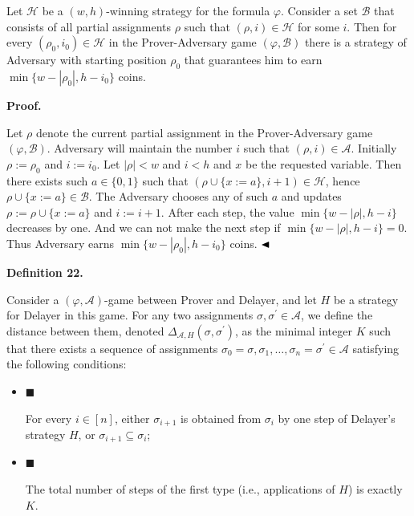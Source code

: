 \documentclass[10pt,a4paper]{article}
\begin{document}
Let $\mathcal{H}$ be a $(w,h)$-winning strategy for the formula $\varphi$.
Consider a set $\mathcal{B}$ that consists of all partial assignments $\rho$ such that $(\rho,i)\in\mathcal{H}$ for some $i$.
Then for every $(\rho_{0},i_{0})\in\mathcal{H}$ in the Prover-Adversary game $(\varphi,\mathcal{B})$ there is a strategy of Adversary with starting position $\rho_{0}$ that guarantees him to earn $\min\{w-|\rho_{0}|,h-i_{0}\}$ coins.\par



\par\medskip\noindent\textbf{Proof.}\par


Let $\rho$ denote the current partial assignment in the Prover-Adversary game
$(\varphi,\mathcal{B})$.
Adversary will maintain the number $i$ such that $(\rho,i)\in\mathcal{A}$.
Initially $\rho:=\rho_{0}$ and $i:=i_{0}$.
Let $|\rho|<w$ and $i<h$ and $x$ be the requested variable.
Then there exists such $a\in\{0,1\}$ such that $(\rho\cup\{x:=a\},i+1)\in\mathcal{H}$,
hence $\rho\cup\{x:=a\}\in\mathcal{B}$.
The Adversary chooses any of such $a$ and updates $\rho:=\rho\cup\{x:=a\}$ and $i:=i+1$.
After each step, the value $\min\{w-|\rho|,h-i\}$ decreases by one.
And we can not make the next step if $\min\{w-|\rho|,h-i\}=0$.
Thus Adversary earns $\min\{w-|\rho_{0}|,h-i_{0}\}$ coins.
$\hfill\blacktriangleleft$\par



\par\medskip\noindent\textbf{
Definition 22.
}\par



Consider a $(\varphi,\mathcal{A})$-game between Prover and Delayer, and let $H$ be a strategy for Delayer in this game.
For any two assignments $\sigma,\sigma^{\prime}\in\mathcal{A}$, we define the distance between them, denoted $\Delta_{\mathcal{A},H}(\sigma,\sigma^{\prime})$, as the minimal integer $K$ such that there exists a sequence of assignments $\sigma_{0}=\sigma,\sigma_{1},\dots,\sigma_{n}=\sigma^{\prime}\in\mathcal{A}$ satisfying the following conditions:\par


\begin{itemize}


\item 
$\blacksquare$ 


For every $i\in[n]$, either $\sigma_{i+1}$ is obtained from $\sigma_{i}$ by one step of Delayer’s strategy $H$, or $\sigma_{i+1}\subseteq\sigma_{i}$;\par





\item 
$\blacksquare$ 


The total number of steps of the first type (i.e., applications of $H$) is exactly $K$.\par





\end{itemize}
\end{document}

